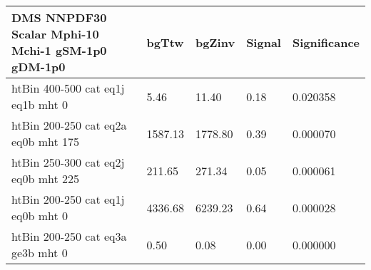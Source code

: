  \begin{tabular}{|l|l|l|l|l|}
\small
   \label{mostSensitiveBins_DMS_NNPDF30_Scalar_Mphi-10_Mchi-1_gSM-1p0_gDM-1p0_25ns}
	\textbf{DMS NNPDF30 Scalar Mphi-10 Mchi-1 gSM-1p0 gDM-1p0}	 & 	bgTtw	 & 	bgZinv	 & 	Signal &	 Significance \\ 
	\hline
	htBin 400-500 cat eq1j eq1b mht 0 & 	5.46	 & 	11.40	 & 	0.18 	&0.020358 \\ 
	htBin 200-250 cat eq2a eq0b mht 175 & 	1587.13	 & 	1778.80	 & 	0.39 	&0.000070 \\ 
	htBin 250-300 cat eq2j eq0b mht 225 & 	211.65	 & 	271.34	 & 	0.05 	&0.000061 \\ 
	htBin 200-250 cat eq1j eq0b mht 0 & 	4336.68	 & 	6239.23	 & 	0.64 	&0.000028 \\ 
	htBin 200-250 cat eq3a ge3b mht 0 & 	0.50	 & 	0.08	 & 	0.00 	&0.000000 \\ 
\end{tabular}

